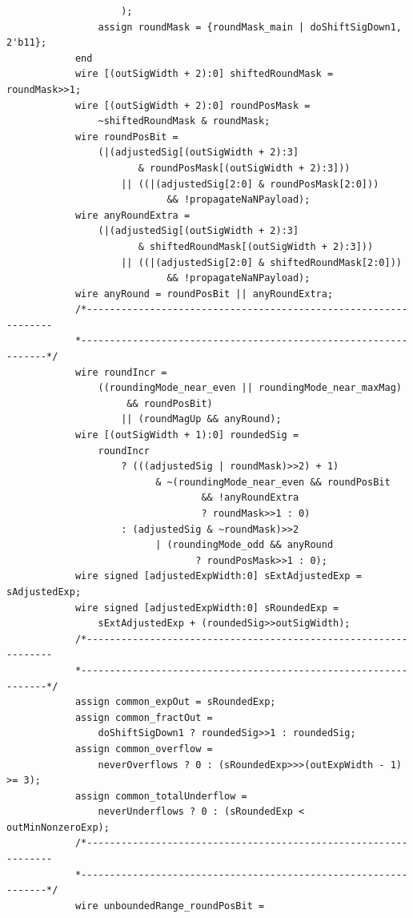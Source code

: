 \documentclass[12pt,letter]{article}
\begin{document}
\begin{lstlisting}
                    );
                assign roundMask = {roundMask_main | doShiftSigDown1, 2'b11};
            end
            wire [(outSigWidth + 2):0] shiftedRoundMask = roundMask>>1;
            wire [(outSigWidth + 2):0] roundPosMask =
                ~shiftedRoundMask & roundMask;
            wire roundPosBit =
                (|(adjustedSig[(outSigWidth + 2):3]
                       & roundPosMask[(outSigWidth + 2):3]))
                    || ((|(adjustedSig[2:0] & roundPosMask[2:0]))
                            && !propagateNaNPayload);
            wire anyRoundExtra =
                (|(adjustedSig[(outSigWidth + 2):3]
                       & shiftedRoundMask[(outSigWidth + 2):3]))
                    || ((|(adjustedSig[2:0] & shiftedRoundMask[2:0]))
                            && !propagateNaNPayload);
            wire anyRound = roundPosBit || anyRoundExtra;
            /*----------------------------------------------------------------
            *----------------------------------------------------------------*/
            wire roundIncr =
                ((roundingMode_near_even || roundingMode_near_maxMag)
                     && roundPosBit)
                    || (roundMagUp && anyRound);
            wire [(outSigWidth + 1):0] roundedSig =
                roundIncr
                    ? (((adjustedSig | roundMask)>>2) + 1)
                          & ~(roundingMode_near_even && roundPosBit
                                  && !anyRoundExtra
                                  ? roundMask>>1 : 0)
                    : (adjustedSig & ~roundMask)>>2
                          | (roundingMode_odd && anyRound
                                 ? roundPosMask>>1 : 0);
            wire signed [adjustedExpWidth:0] sExtAdjustedExp = sAdjustedExp;
            wire signed [adjustedExpWidth:0] sRoundedExp =
                sExtAdjustedExp + (roundedSig>>outSigWidth);
            /*----------------------------------------------------------------
            *----------------------------------------------------------------*/
            assign common_expOut = sRoundedExp;
            assign common_fractOut =
                doShiftSigDown1 ? roundedSig>>1 : roundedSig;
            assign common_overflow =
                neverOverflows ? 0 : (sRoundedExp>>>(outExpWidth - 1) >= 3);
            assign common_totalUnderflow =
                neverUnderflows ? 0 : (sRoundedExp < outMinNonzeroExp);
            /*----------------------------------------------------------------
            *----------------------------------------------------------------*/
            wire unboundedRange_roundPosBit =

\end{lstlisting}
\end{document}
